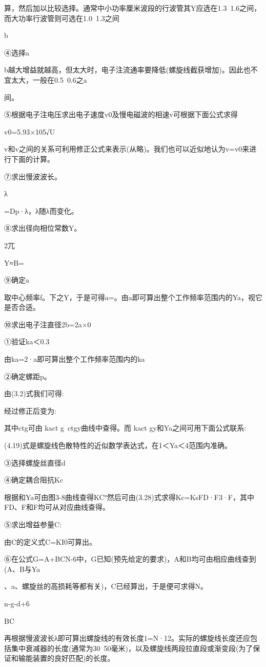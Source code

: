 算，然后加以比较选择。通常中小功率厘米波段的行波管其Y应选在1.3~1.6之间，而大功率行波管则可选在1.0~1.3之间


b


④选择a


b越大增益就越高，但太大时，电子注流通率要降低(螺旋线截获增加)。因此也不宜太大，一般在0.5~0.6之a


间。


⑤根据电子注电压求出电子速度v0及慢电磁波的相速v可根据下面公式求得


v0=5.93×105√U


v和v之间的关系可利用修正公式来表示(从略)。我们也可以近似地认为v=v0来进行下面的计算。


⑦求出慢波波长。


λ


=Dp·λ，λ随λ而变化。


⑧求出径向相位常数Y。


2兀


Y≈B=


⑨确定a


取中心频率f。下之Y，于是可得a=。由a即可算出整个工作频率范围内的Ya，视它是否合适。


⑩求出电子注直径2b=2a×0


①验证ka＜0.3


由ka=2·a即可算出整个工作频率范围内的ka


②确定螺距p。


由(3.2)式我们可得:


经过修正后变为:


其中ctg可由 kact g~ctgy曲线中查得。而 kact gy和Ya之间可用下面公式联系:


(4.19)式是螺旋线色散特性的近似数学表达式，在1＜Ya＜4范围内准确。


③选择螺旋丝直径d


④确定耦合阻抗Kc


根据和Ya可由图3-8曲线查得KC°然后可由(3.28)式求得Kc=KsFD·F3·F，其中FD、F和F均可从对应曲线查得。


⑤求出增益参量C:


由C的定义式C=KI0可算出。


⑥在公式G=A+BCN-6中，G已知(预先给定的要求)，A和B均可由相应曲线查到(A、B与Ya


、a、螺旋丝的高损耗等都有关)，C已经算出，于是便可求得N。


n-g-d+6


BC


再根据慢波波长λ即可算出螺旋线的有效长度1=N·12。实际的螺旋线长度还应包括集中衰减器的长度(通常为30~50毫米)，以及螺旋线两段拉直段或渐变段(为了保证和输能装置的良好匹配)的长度。


